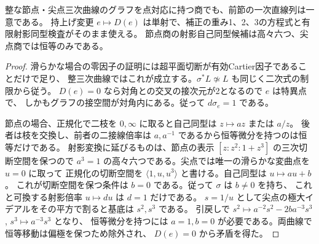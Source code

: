 \begin{proposition}\label{prop:integral-singular-central}
整な節点・尖点三次曲線のグラフを点対応に持つ商でも、前節の一次直線列は一意である。
持上げ変更 $e\mapsto D(e)$ は単射で、補正の重み1、2、3の方程式と有限射影同型検査がそのまま使える。
節点商の射影自己同型候補は高々六つ、尖点商では恒等のみである。
\end{proposition}
\begin{proof}
滑らかな場合の零因子の証明には超平面切断が有効Cartier因子であることだけで足り、
整三次曲線ではこれが成立する。$\sigma^*L\not\simeq L$ も同じく二次式の制限から従う。
$D(e)=0$ なら対角との交叉の接次元が2となるので $e$ は特異点で、
しかもグラフの接空間が対角内にある。従って $d\sigma_e=1$ である。

節点の場合、正規化で二枝を $0,\infty$ に取ると自己同型は $z\mapsto a z$ または $a/z$。
後者は枝を交換し、前者の二接線倍率は $a,a^{-1}$ であるから恒等微分を持つのは恒等だけである。
射影変換に延びるものは、節点の表示 $[z:z^2:1+z^3]$ の三次切断空間を保つので
$a^3=1$ の高々六つである。尖点では唯一の滑らかな変曲点を $u=0$ に取って
正規化の切断空間を $\langle1,u,u^3\rangle$ と書ける。自己同型は $u\mapsto a u+b$。
これが切断空間を保つ条件は $b=0$ である。従って $\sigma$ は $b\ne0$ を持ち、
これと可換する射影倍率 $u\mapsto d u$ は $d=1$ だけである。
$s=1/u$ として尖点の極大イデアルをその平方で割ると基底は $s^2,s^3$ である。
引戻しで $s^2\mapsto a^{-2}s^2-2ba^{-3}s^3$, $s^3\mapsto a^{-3}s^3$ となり、
恒等微分を持つには $a=1,b=0$ が必要である。両曲線で恒等移動は偏極を保つため除外され、
$D(e)=0$ から矛盾を得た。
\end{proof}

